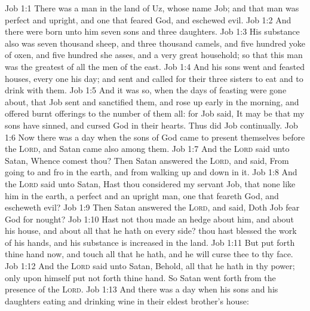 \vs Job 1:1 There was a man in the land of Uz, whose name  Job; and that man was perfect and upright, and one that feared God, and eschewed evil.
\vs Job 1:2 And there were born unto him seven sons and three daughters.
\vs Job 1:3 His substance also was seven thousand sheep, and three thousand camels, and five hundred yoke of oxen, and five hundred she asses, and a very great household; so that this man was the greatest of all the men of the east.
\vs Job 1:4 And his sons went and feasted  houses, every one his day; and sent and called for their three sisters to eat and to drink with them.
\vs Job 1:5 And it was so, when the days of  feasting were gone about, that Job sent and sanctified them, and rose up early in the morning, and offered burnt offerings  to the number of them all: for Job said, It may be that my sons have sinned, and cursed God in their hearts. Thus did Job continually.
\vs Job 1:6 Now there was a day when the sons of God came to present themselves before the \textsc{Lord}, and Satan came also among them.
\vs Job 1:7 And the \textsc{Lord} said unto Satan, Whence comest thou? Then Satan answered the \textsc{Lord}, and said, From going to and fro in the earth, and from walking up and down in it.
\vs Job 1:8 And the \textsc{Lord} said unto Satan, Hast thou considered my servant Job, that  none like him in the earth, a perfect and an upright man, one that feareth God, and escheweth evil?
\vs Job 1:9 Then Satan answered the \textsc{Lord}, and said, Doth Job fear God for nought?
\vs Job 1:10 Hast not thou made an hedge about him, and about his house, and about all that he hath on every side? thou hast blessed the work of his hands, and his substance is increased in the land.
\vs Job 1:11 But put forth thine hand now, and touch all that he hath, and he will curse thee to thy face.
\vs Job 1:12 And the \textsc{Lord} said unto Satan, Behold, all that he hath  in thy power; only upon himself put not forth thine hand. So Satan went forth from the presence of the \textsc{Lord}.
\vs Job 1:13 And there was a day when his sons and his daughters  eating and drinking wine in their eldest brother's house:

